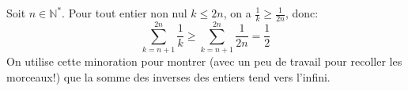 Soit $n\in\mathbb{N}^*$. Pour tout entier non nul $k\leq 2n$, on a $\frac{1}{k}\geq \frac{1}{2n}$, donc:
\[
\sum_{k=n+1}^{2n}{\frac{1}{k}}\geq \sum_{k=n+1}^{2n}{\frac{1}{2n}}=\frac{1}{2}
\]
On utilise cette minoration pour montrer (avec un peu de travail pour recoller les morceaux!) que la somme des inverses des entiers tend vers l'infini.
